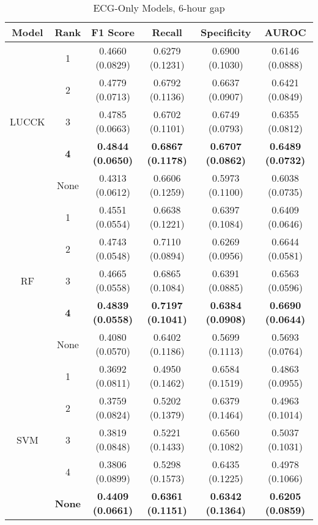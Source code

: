 

\begin{table}
    \centering
    \caption{ECG-Only Models, 6-hour gap}
    \begin{tabular}{|c|c|c|c|c|c|}
    \hline
        Model & Rank & F1 Score & Recall & Specificity & AUROC \\
        \hline
          & 1 & 0.4660 (0.0829) & 0.6279 (0.1231) & 0.6900 (0.1030) & 0.6146 (0.0888)\\
          & 2 & 0.4779 (0.0713) & 0.6792 (0.1136) & 0.6637 (0.0907) & 0.6421 (0.0849)\\
         LUCCK & 3 & 0.4785 (0.0663) & 0.6702 (0.1101) & 0.6749 (0.0793) & 0.6355 (0.0812)\\
          & \textbf{4} & \textbf{0.4844 (0.0650)} & 
         \textbf{0.6867 (0.1178)} & \textbf{0.6707 (0.0862)} & \textbf{0.6489 (0.0732)}\\
          & None & 0.4313 (0.0612) & 0.6606 (0.1259) & 0.5973 (0.1100) & 0.6038 (0.0735)\\
        \hline
         & 1 & 0.4551 (0.0554) & 0.6638 (0.1221) & 0.6397 (0.1084) & 0.6409 (0.0646)\\
          & 2 & 0.4743 (0.0548) & 0.7110 (0.0894) & 0.6269 (0.0956) & 0.6644 (0.0581)\\
         RF & 3 & 0.4665 (0.0558) & 0.6865 (0.1084) & 0.6391 (0.0885) & 0.6563 (0.0596)\\
          & \textbf{4} & \textbf{0.4839 (0.0558)} & \textbf{0.7197 (0.1041)} & \textbf{0.6384 (0.0908)} & \textbf{0.6690 (0.0644)}\\
          & None & 0.4080 (0.0570) & 0.6402 (0.1186) & 0.5699 (0.1113) & 0.5693 (0.0764)\\
        \hline
          & 1 & 0.3692 (0.0811) & 0.4950 (0.1462) & 0.6584 (0.1519) & 0.4863 (0.0955)\\
          & 2 & 0.3759 (0.0824) & 0.5202 (0.1379) & 0.6379 (0.1464) & 0.4963 (0.1014)\\
         SVM & 3 & 0.3819 (0.0848) & 0.5221 (0.1433) & 0.6560 (0.1082) & 0.5037 (0.1031)\\
          & 4 & 0.3806 (0.0899) & 0.5298 (0.1573) & 0.6435 (0.1225) & 0.4978 (0.1066)\\
          & \textbf{None} & \textbf{0.4409 (0.0661)} & \textbf{0.6361 (0.1151)} & \textbf{0.6342 (0.1364)} & \textbf{0.6205 (0.0859)}\\
        \hline                 
    \end{tabular}
\end{table}

